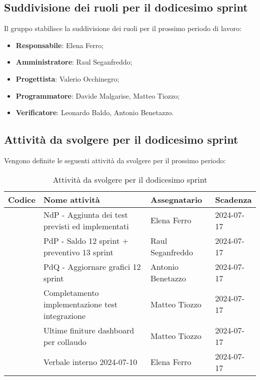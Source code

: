 \documentclass[italian,12pt]{article}
\begin{document}
\subsection{Suddivisione dei ruoli per il dodicesimo sprint}
Il gruppo stabilisce la suddivisione dei ruoli per il prossimo periodo di lavoro:
\begin{itemize}
	\item \textbf{Responsabile}: Elena Ferro;
	\item \textbf{Amministratore}: Raul Seganfreddo;
	\item \textbf{Progettista}: Valerio Occhinegro;
	\item \textbf{Programmatore}: Davide Malgarise, Matteo Tiozzo;
	\item \textbf{Verificatore}: Leonardo Baldo, Antonio Benetazzo.
\end{itemize}

\newpage

\subsection{Attività da svolgere per il dodicesimo sprint}
Vengono definite le seguenti attività da svolgere per il prossimo periodo:
\begin{table}[!h]
	\centering
	\begin{tabular}{ |l||p{7cm}|l|l| }
		\hline
		\textbf{Codice}    & \textbf{Nome attività}                           & \textbf{Assegnatario} & \textbf{Scadenza} \\
		\hline
		\mySkip[86bz8e29k] & NdP - Aggiunta dei test previsti ed implementati & Elena Ferro           & 2024-07-17        \\
		\mySkip[86bz8e6dg] & PdP - Saldo 12 sprint + preventivo 13 sprint     & Raul Seganfreddo      & 2024-07-17        \\
		\mySkip[86bz0pf93] & PdQ - Aggiornare grafici 12 sprint               & Antonio Benetazzo     & 2024-07-17        \\
		\mySkip[86byzyxt4] & Completamento implementazione test integrazione  & Matteo Tiozzo         & 2024-07-17        \\
		\mySkip[86bzjkpg8] & Ultime finiture dashboard per collaudo           & Matteo Tiozzo         & 2024-07-17        \\
		\mySkip[86bzjkpy4] & Verbale interno 2024-07-10                       & Elena Ferro           & 2024-07-17        \\
		\hline
	\end{tabular}
	\caption{Attività da svolgere per il dodicesimo sprint}
\end{table}
\end{document}
